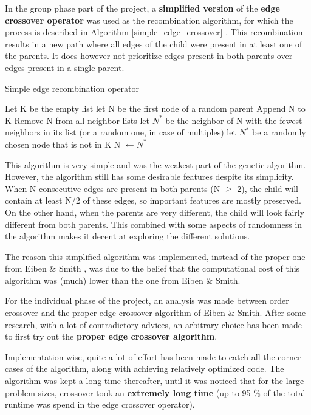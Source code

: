 \documentclass[a4paper,10pt]{article}
\begin{document}
In the group phase part of the project, a \textbf{simplified version} of the \textbf{edge crossover operator} was used as the recombination algorithm, for which the process is described in Algorithm \ref{simple_edge_crossover} \cite{initial_implementation_edge_crossover}. This recombination results in a new path where all edges of the child were present in at least one of the parents. It does however not prioritize edges present in both parents over edges present in a single parent.

\begin{algorithm}
\caption{Simple edge recombination operator}\label{simple_edge_crossover}
\begin{algorithmic}
\State Let K be the empty list
\State let N be the first node of a random parent
\State Append N to K
\State Remove N from all neighbor lists
\State let $N^*$ be the neighbor of N with the fewest neighbors in its list (or a random one, in case of multiples)
\Else 
\State let $N^*$ be a randomly chosen node that is not in K
\EndIf
\State N $\gets N^*$
\EndWhile
\end{algorithmic}
\end{algorithm}

This algorithm is very simple and was the weakest part of the genetic algorithm. However, the algorithm still has some desirable features despite its simplicity. When N consecutive edges are present in both parents (N $ \ge $ 2), the child will contain at least N/2 of these edges, so important features are mostly preserved. On the other hand,
when the parents are very different, the child will look fairly different from both parents. This combined with some aspects of randomness in the algorithm makes it decent at exploring the different solutions. 

The reason this simplified algorithm was implemented, instead of the proper one from Eiben \& Smith \cite{eiben_smith}, was due to the belief that the computational cost of this algorithm was (much) lower than the one from Eiben \& Smith. 

For the individual phase of the project, an analysis was made between order crossover and the proper edge crossover algorithm of Eiben \& Smith. After some research, with a lot of contradictory advices, an arbitrary choice has been made to first try out the \textbf{proper edge crossover algorithm}.

Implementation wise, quite a lot of effort has been made to catch all the corner cases of the algorithm, along with achieving relatively optimized code. The algorithm was kept a long time thereafter, until it was noticed that for the large problem sizes, crossover took an \textbf{extremely long time} (up to 95 \% of the total runtime was spend in the edge crossover operator).
\end{document}
